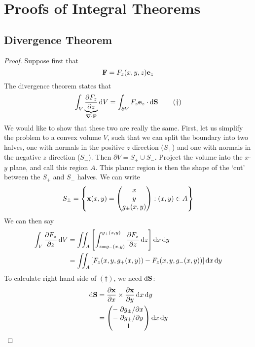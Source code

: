 \documentclass{article}
\begin{document}
\section{Proofs of Integral Theorems}
\subsection{Divergence Theorem}
\begin{proof}
    Suppose first that
    \[ \vb F = F_z(x,y,z) \vb e_z \]
    The divergence theorem states that
    \begin{equation}
        \int_V \underbrace{\pdv{F_z}{z}}_{\div{\vb F}} \dd{V} = \int_{\partial V} F_z \vb e_z \cdot \dd{\vb S}
        \tag{$\dagger$}
    \end{equation}
    We would like to show that these two are really the same. First, let us simplify the problem to a convex volume $V$, such that we can split the boundary into two halves, one with normals in the positive $z$ direction ($S_+$) and one with normals in the negative $z$ direction ($S_-$). Then $\partial V = S_+ \cup S_-$. Project the volume into the $x$-$y$ plane, and call this region $A$. This planar region is then the shape of the `cut' between the $S_+$ and $S_-$ halves. We can write
    \[ S_\pm = \left\{ \vb x(x, y) = \begin{pmatrix}
            x \\ y \\ g_\pm (x, y)
        \end{pmatrix} : (x, y) \in A \right\} \]
    We can then say
    \begin{align*}
        \int_V \pdv{F_z}{z} \dd{V} & = \iint_{A} \left[ \int_{z = g_- (x, y)}^{g_+ (x, y)} \pdv{F_z}{z} \dd{z} \right] \dd{x} \dd{y} \\
                                   & = \iint_A \left[ F_z(x, y, g_+ (x, y)) - F_z(x, y, g_- (x, y)) \right] \dd{x}\dd{y}
    \end{align*}
    To calculate right hand side of $(\dagger)$, we need $\dd{\vb S}$:
    \begin{align*}
        \dd{\vb S} & = \pdv{\vb x}{x} \times \pdv{\vb x}{y} \dd{x}\dd{y} \\
                   & = \begin{pmatrix}
            -\pdv*{g_\pm}{x} \\
            -\pdv*{g_\pm}{y} \\
            1                \\
        \end{pmatrix} \dd{x}\dd{y}

\end{align*}
\end{proof}
\end{document}
